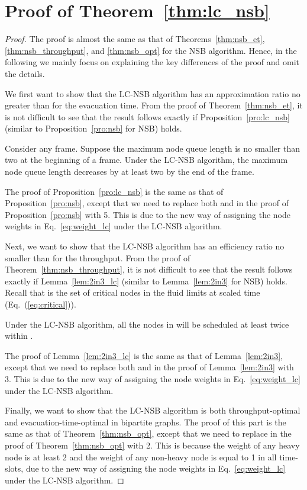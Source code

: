 \documentclass[10pt,journal,compsoc]{IEEEtran}
\newcommand{\high}[1]{{\color{black}{#1}}}
\begin{document}
\section{Proof of Theorem~\ref{thm:lc_nsb}} \label{sec:thm:lc_nsb}
\begin{proof}
The proof is almost the same as that of Theorems~\ref{thm:nsb_et}, \ref{thm:nsb_throughput}, 
and \ref{thm:nsb_opt} for the NSB algorithm.
Hence, in the following we mainly focus on explaining the key differences of the proof and omit the details.

We first want to show that the LC-NSB algorithm has an approximation ratio no greater than  
for the evacuation time. From the proof of Theorem~\ref{thm:nsb_et}, it is not difficult to see that 
the result follows exactly if Proposition~\ref{pro:lc_nsb} (similar to Proposition~\ref{pro:nsb} 
for NSB) holds.

\begin{proposition}
\label{pro:lc_nsb}
Consider any frame.
Suppose the maximum node queue length is no smaller than two at the beginning of a frame. 
Under the LC-NSB algorithm, the maximum node queue length decreases by at least two 
by the end of the frame.
\end{proposition}

The proof of Proposition~\ref{pro:lc_nsb} is the same as that of Proposition~\ref{pro:nsb},
except that we need to replace both  and  in the proof 
of Proposition~\ref{pro:nsb} with 5. This is due to the new way of assigning the 
node weights in Eq.~\eqref{eq:weight_lc} under the LC-NSB algorithm.

Next, we want to show that the LC-NSB algorithm has an efficiency ratio no smaller than  for the throughput.
From the proof of Theorem~\ref{thm:nsb_throughput}, it is not difficult to see that the result follows exactly 
if Lemma~\ref{lem:2in3_lc} (similar to Lemma~\ref{lem:2in3} for NSB) holds.
Recall that  is the set of critical nodes in the fluid limits at scaled time  (Eq.~(\ref{eq:critical})).

\begin{lemma}
\label{lem:2in3_lc}
Under the LC-NSB algorithm, all the nodes in  will be scheduled at least twice within 
\high{each frame of interval }.
\end{lemma}

The proof of Lemma~\ref{lem:2in3_lc} is the same as that of Lemma~\ref{lem:2in3},
except that we need to replace both  and  
in the proof of Lemma~\ref{lem:2in3} with 3. This is due to the new way of assigning the 
node weights in Eq.~\eqref{eq:weight_lc} under the LC-NSB algorithm.
 
Finally, we want to show that the LC-NSB algorithm is both throughput-optimal 
and evacuation-time-optimal in bipartite graphs.
The proof of this part is the same as that of Theorem~\ref{thm:nsb_opt},
except that we need to replace  in the proof 
of Theorem~\ref{thm:nsb_opt} with 2. This is because the weight of any heavy 
node is at least 2 and the weight of any non-heavy node is equal to 1 in all time-slots,
due to the new way of assigning the node weights in Eq.~\eqref{eq:weight_lc} under the LC-NSB algorithm. 
\end{proof}
\end{document}
